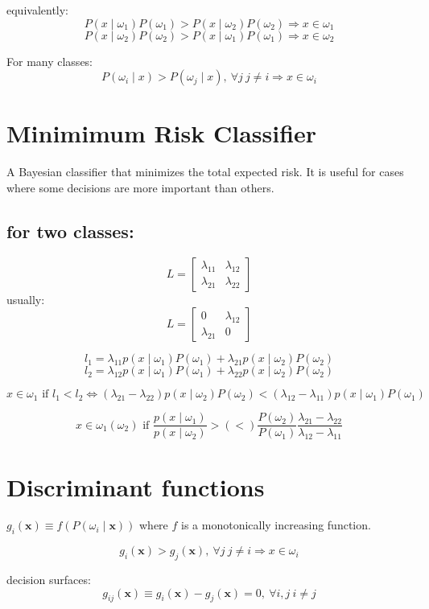 \documentclass{report}
\begin{document}
equivalently:
\[P(x \mid \omega_1)P(\omega_1) > P(x \mid \omega_2)P(\omega_2) \Rightarrow x \in \omega_1\]
\[P(x \mid \omega_2)P(\omega_2) > P(x \mid \omega_1)P(\omega_1) \Rightarrow x \in \omega_2\]

For many classes:
\[P(\omega_i \mid x) > P(\omega_j \mid x),\ \forall j\ j \neq i \Rightarrow x \in \omega_i\]

\section{Minimimum Risk Classifier}
A Bayesian classifier that minimizes the total expected risk. It is useful for cases where some decisions are more important than others.

\subsection*{for two classes:}
\[L = \begin{bmatrix}
	\lambda_{11} & \lambda_{12} \\
	\lambda_{21} & \lambda_{22}
\end{bmatrix}\]
usually:
\[L = \begin{bmatrix}
	0 & \lambda_{12} \\
	\lambda_{21} & 0
\end{bmatrix}\]

\[l_1 = \lambda_{11} p(x \mid \omega_1)P(\omega_1) + \lambda_{21} p(x \mid \omega_2)P(\omega_2)\]
\[l_2 = \lambda_{12} p(x \mid \omega_1)P(\omega_1) + \lambda_{22} p(x \mid \omega_2)P(\omega_2)\]

\[x \in \omega_1 \text{ if } l_1 < l_2 \Leftrightarrow (\lambda_{21}-\lambda_{22}) p(x \mid \omega_2)P(\omega_2) < (\lambda_{12}-\lambda_{11}) p(x \mid \omega_1)P(\omega_1)\]

\[x \in \omega_1 (\omega_2) \text{ if } \frac{p(x \mid \omega_1)}{p(x \mid \omega_2)} > (<) \frac{P(\omega_2)}{P(\omega_1)}\frac{\lambda_{21}-\lambda_{22}}{\lambda_{12}-\lambda_{11}}\]

\section{Discriminant functions}
$g_i (\symbf{x}) \equiv f(P(\omega_i \mid \symbf{x}))$ where $f$ is a monotonically increasing function.

\[g_i(\symbf{x}) > g_j(\symbf{x}),\ \forall j\ j \neq i \Rightarrow x \in \omega_i\]

decision surfaces:
\[g_{ij}(\symbf{x}) \equiv g_i(\symbf{x}) - g_j(\symbf{x}) = 0,\ \forall i, j\ i \neq j\]
\end{document}
